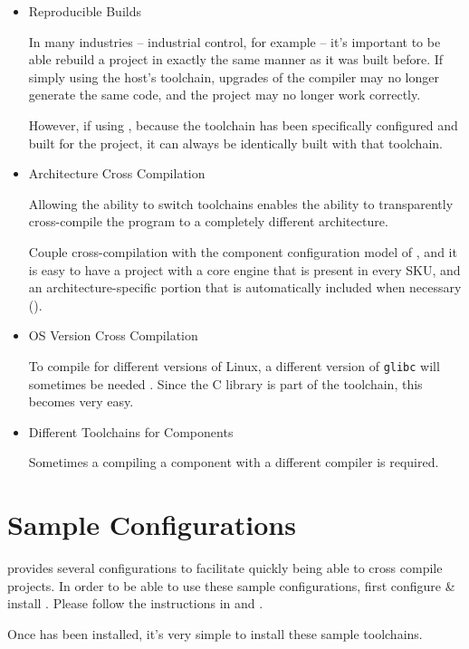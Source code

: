 \begin{itemize}
\item Reproducible Builds

  In many industries -- industrial control, for example -- it's
  important to be able rebuild a project in exactly the same manner as
  it was built before.  If simply using the host's toolchain, upgrades
  of the compiler may no longer generate the same code, and the
  project may no longer work correctly.

  However, if using \lmsbw, because the toolchain has been
  specifically configured and built for the project, it can always be
  identically built with that toolchain.

\item Architecture Cross Compilation

  Allowing the ability to switch toolchains enables the ability to
  transparently cross-compile the program to a completely different
  architecture.

  Couple cross-compilation with the component configuration model of
  \lmsbw, and it is easy to have a project with a core engine that is
  present in every SKU, and an architecture-specific portion that is
  automatically included when necessary
  ().

\item{OS Version Cross Compilation}

  To compile for different versions of Linux, a different version of
  \texttt{glibc} will sometimes be needed .  Since the C library is
  part of the toolchain, this becomes very easy.

\item Different Toolchains for Components

  Sometimes a compiling a component with a different compiler is
  required.
\end{itemize}

\section{Sample Configurations}

\lmsbw provides several \ctng configurations to facilitate quickly
being able to cross compile projects.  In order to be able to use
these sample configurations, first configure \& install \ctng.  Please
follow the instructions in  and
.

Once \ctng has been installed, it's very simple to install these
sample toolchains.

